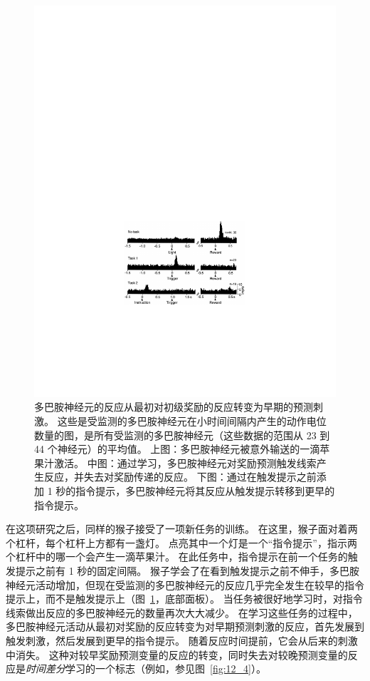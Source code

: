 \begin{figure}[!htb]
	\centering
	\includegraphics[width=0.55\linewidth]{chap12/fig_12_3}
	\caption{多巴胺神经元的反应从最初对初级奖励的反应转变为早期的预测刺激。
		这些是受监测的多巴胺神经元在小时间间隔内产生的动作电位数量的图，是所有受监测的多巴胺神经元（这些数据的范围从 23 到 44 个神经元）的平均值。
		上图：多巴胺神经元被意外输送的一滴苹果汁激活。
		中图：通过学习，多巴胺神经元对奖励预测触发线索产生反应，并失去对奖励传递的反应。
		下图：通过在触发提示之前添加 1 秒的指令提示，多巴胺神经元将其反应从触发提示转移到更早的指令提示\cite{schultz1994reward}。
		\label{fig:12_3}}
\end{figure}



在这项研究之后，同样的猴子接受了一项新任务的训练\cite{schultz1993responses}。
在这里，猴子面对着两个杠杆，每个杠杆上方都有一盏灯。
点亮其中一个灯是一个“指令提示”，指示两个杠杆中的哪一个会产生一滴苹果汁。
在此任务中，指令提示在前一个任务的触发提示之前有 1 秒的固定间隔。
猴子学会了在看到触发提示之前不伸手，多巴胺神经元活动增加，但现在受监测的多巴胺神经元的反应几乎完全发生在较早的指令提示上，而不是触发提示上（图~\ref{fig:12_3}，底部面板）。
当任务被很好地学习时，对指令线索做出反应的多巴胺神经元的数量再次大大减少。
在学习这些任务的过程中，多巴胺神经元活动从最初对奖励的反应转变为对早期预测刺激的反应，首先发展到触发刺激，然后发展到更早的指令提示。
随着反应时间提前，它会从后来的刺激中消失。
这种对较早奖励预测变量的反应的转变，同时失去对较晚预测变量的反应是\textit{时间差分}学习的一个标志（例如，参见图~\ref{fig:12_4}）。


